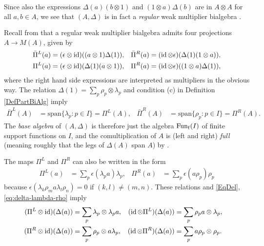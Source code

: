 \begin{Rem} 
Since also the expressions $\Delta(a)(b\otimes 1)$ and $(1\otimes a)\Delta(b)$ are in $A\otimes A$ for all $a,b\in A$, we see that $(A,\Delta)$ is in fact a \emph{regular} weak multiplier bialgebra \cite[Definition 2.3]{Boh1}.
\end{Rem} 


Recall from \cite[Section 3]{Boh1} that a regular weak multiplier
bialgebra admits four projections $A\rightarrow M(A)$, given
by \begin{align*} \bar{\Pi}^L(a) = (\epsilon\otimes \operatorname{id})((a\otimes
  1)\Delta(1)),\quad & \bar{\Pi}^R(a) = (\operatorname{id}\otimes
  \epsilon)(\Delta(1)(1\otimes a)),\\ \Pi^L(a) = (\epsilon\otimes
  \operatorname{id})(\Delta(1)(a\otimes 1)),\quad& \Pi^R(a) =
  (\operatorname{id}\otimes\epsilon)((1\otimes a)\Delta(1)),\end{align*} where the
right hand side expressions are interpreted as multipliers in the
obvious way. The relation  $\Delta(1)=\sum_{p} \rho_{p} \otimes \lambda_{p}$ and  condition (c) in Definition \ref{DefPartBiAlg} imply
\begin{align*}
  \bar \Pi^{L}(A) &=\mathrm{span}\{\lambda_{p}:p\in I\} =  \Pi^{L}(A), &
  \bar \Pi^{R}(A) &= \mathrm{span}\{\rho_{p}:p\in I\} =\Pi^{R}(A).
\end{align*}
The \emph{base algebra} of $(A,\Delta)$ is therefore just the algebra
$\mathrm{Fun}_{\operatorname{\mathrm{f}}}(I)$ of finite support functions on $I$, and the
comultiplication of $A$ is (left and right) \emph{full} (meaning
roughly that the legs of $\Delta(A)$ span $A$) by \cite[Theorem
3.13]{Boh1}.  

 The maps $\Pi^{L}$ and $\Pi^{R}$ can also
be written in the form
\begin{align} \label{eq:pi} 
    \Pi^L(a) & = \sum_{p}\epsilon(\lambda_{p}a)\lambda_p, & \Pi^R(a) & =    \sum_{p}\epsilon(a \rho_{p}) \rho_p
\end{align}
because $\epsilon(\lambda_{k}\rho_{m} a \lambda_{l}\rho_{n})=0$  if $(k,l)\neq(m,n)$. These relations and  \eqref{EqDel}, \eqref{eq:delta-lambda-rho} imply
\begin{align} \label{eq:pi-l-delta}
  (\Pi^{L} \otimes \operatorname{id})(\Delta(a)) &= \sum_{p} \lambda_{p}\otimes \lambda_{p}a, &
  (\operatorname{id} \otimes \Pi^{L})(\Delta(a)) &= \sum_{p} \rho_{p}a \otimes \lambda_{p}, & \\ \label{eq:pi-r-delta}
  (\Pi^{R} \otimes \operatorname{id})(\Delta(a)) &= \sum_{p} \rho_{p} \otimes a\lambda_{p}, &
  (\operatorname{id} \otimes \Pi^{R})(\Delta(a)) &= \sum_{p} a\rho_{p} \otimes \rho_{p}.
\end{align}


